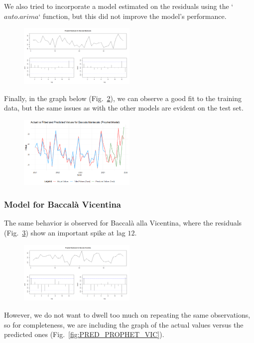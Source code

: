 \documentclass[10pt,twocolumn,letterpaper]{article}
\begin{document}
We also tried to incorporate a model estimated on the residuals using the `$auto.arima$` function, but this did not improve the model's performance. 
\begin{figure}[H]
    \centering
    \includegraphics[width=0.5\textwidth]{PlotsBEFD/RES_PROPHET_MAN.png} 
    \caption{}
    \label{fig:RES_PROPHET_MAN}
\end{figure}
Finally, in the graph below (Fig.~\ref{fig:PRED_PROPHET_MAN}), we can observe a good fit to the training data, but the same issues as with the other models are evident on the test set.
\begin{figure}[H]
    \centering
    \includegraphics[width=0.5\textwidth]{PlotsBEFD/PRED_PROPHET_MAN.png} 
    \caption{}
    \label{fig:PRED_PROPHET_MAN}
\end{figure}

\subsubsection{Model for Baccalà Vicentina}
The same behavior is observed for Baccalà alla Vicentina, where the residuals (Fig.~\ref{fig:RES_PROPHET_VIC}) show an important spike at lag $12$. 
\begin{figure}[H]
    \centering
    \includegraphics[width=0.5\textwidth]{PlotsBEFD/RES_PROPHET_VIC.png} 
    \caption{}
    \label{fig:RES_PROPHET_VIC}
\end{figure} 
However, we do not want to dwell too much on repeating the same observations, so for completeness, we are including the graph of the actual values versus the predicted ones (Fig.~\ref{fig:PRED_PROPHET_VIC}). 
\end{document}
